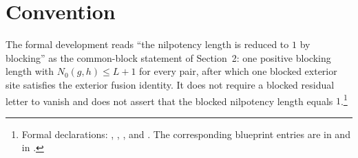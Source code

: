 \documentclass{article}
\begin{document}
\section{Convention}

The formal development reads ``the nilpotency length is reduced to $1$
by blocking'' as the common-block statement of
Section~2: one positive blocking length with $N_0(g,h)\leq L+1$ for every
pair, after which one blocked exterior site satisfies the exterior fusion
identity.  It does not require a blocked residual letter to vanish and
does not assert that the blocked nilpotency length equals $1$.\footnote{Formal
declarations:
,
,
,
and
.
The corresponding blueprint entries are
 in
 and
 in
.}



\end{document}
